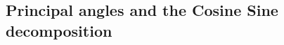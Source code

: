 \documentclass[twoside,11pt]{book}
\numberwithin{theorem}{chapter}
\numberwithin{definition}{chapter}
\numberwithin{proposition}{chapter}
\numberwithin{corollary}{chapter}
\numberwithin{example}{chapter}
\numberwithin{lemma}{chapter}
\numberwithin{assumption}{chapter}
\numberwithin{equation}{chapter}
\numberwithin{figure}{chapter}
\DeclareMathOperator{\Det}{Det}
\begin{document}
\begin{subappendices}


\section{Principal angles and the Cosine Sine decomposition}
\label{app:principal_angles}



\end{subappendices}
\end{document}
